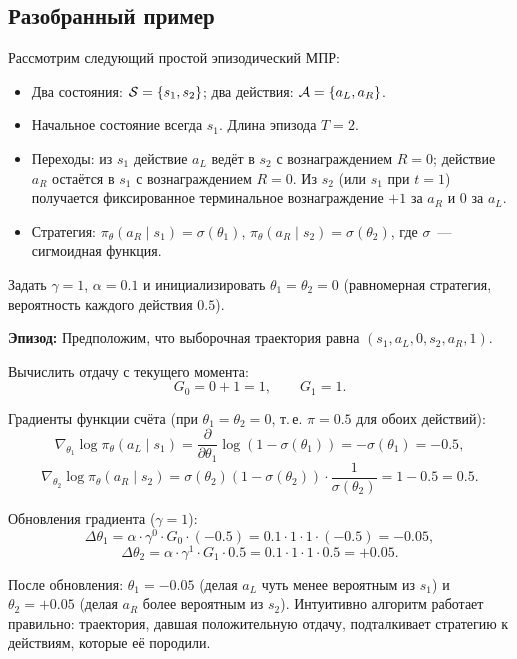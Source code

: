 \subsection{Разобранный пример}

\begin{example}
\label{ex:reinforce-two-state}

Рассмотрим следующий простой эпизодический МПР:
\begin{itemize}[leftmargin=*]
\item Два состояния: $\mathcal{S} = \{s_1, s_2\}$; два действия: $\mathcal{A} = \{a_L, a_R\}$.
\item Начальное состояние всегда $s_1$. Длина эпизода $T = 2$.
\item Переходы: из $s_1$ действие $a_L$ ведёт в $s_2$ с вознаграждением $R=0$; действие $a_R$ остаётся в $s_1$ с вознаграждением $R=0$. Из $s_2$ (или $s_1$ при $t=1$) получается фиксированное терминальное вознаграждение $+1$ за $a_R$ и $0$ за $a_L$.
\item Стратегия: $\pi_\theta(a_R \mid s_1) = \sigma(\theta_1)$, $\pi_\theta(a_R \mid s_2) = \sigma(\theta_2)$, где $\sigma$ \,---\, сигмоидная функция.
\end{itemize}

Задать $\gamma = 1$, $\alpha = 0.1$ и инициализировать $\theta_1 = \theta_2 = 0$ (равномерная стратегия, вероятность каждого действия $0.5$).

\medskip
\noindent\textbf{Эпизод:}  Предположим, что выборочная траектория равна $(s_1, a_L, 0, s_2, a_R, 1)$.

\medskip
Вычислить отдачу с текущего момента:
\[
G_0 = 0 + 1 = 1, \qquad G_1 = 1.
\]

Градиенты функции счёта (при $\theta_1 = \theta_2 = 0$, т.\,е. $\pi = 0.5$ для обоих действий):
\[
\nabla_{\theta_1} \log \pi_\theta(a_L \mid s_1)
= \frac{\partial}{\partial \theta_1} \log(1 - \sigma(\theta_1))
= -\sigma(\theta_1) = -0.5,
\]
\[
\nabla_{\theta_2} \log \pi_\theta(a_R \mid s_2)
= \sigma(\theta_2)(1 - \sigma(\theta_2)) \cdot \frac{1}{\sigma(\theta_2)} = 1 - 0.5 = 0.5.
\]

Обновления градиента ($\gamma = 1$):
\[
\Delta \theta_1 = \alpha \cdot \gamma^0 \cdot G_0 \cdot (-0.5) = 0.1 \cdot 1 \cdot 1 \cdot (-0.5) = -0.05,
\]
\[
\Delta \theta_2 = \alpha \cdot \gamma^1 \cdot G_1 \cdot 0.5 = 0.1 \cdot 1 \cdot 1 \cdot 0.5 = +0.05.
\]

После обновления: $\theta_1 = -0.05$ (делая $a_L$ чуть менее вероятным из $s_1$) и $\theta_2 = +0.05$ (делая $a_R$ более вероятным из $s_2$). Интуитивно алгоритм работает правильно: траектория, давшая положительную отдачу, подталкивает стратегию к действиям, которые её породили.
\end{example}

